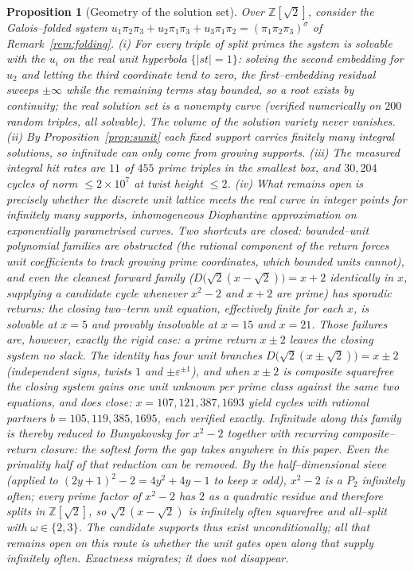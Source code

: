 \documentclass[11pt]{article}
\newtheorem{proposition}[theorem]{Proposition}
\theoremstyle{definition}
\begin{document}
\begin{proposition}[Geometry of the solution set]\label{prop:geometry}
Over $\mathbb{Z}[\sqrt2]$, consider the Galois--folded system
$u_1\pi_2\pi_3+u_2\pi_1\pi_3+u_3\pi_1\pi_2=(\pi_1\pi_2\pi_3)^\sigma$ of
Remark~\textup{\ref{rem:folding}}. \textup{(i)} For \emph{every} triple of split primes the system is
solvable with the $u_i$ on the real unit hyperbola $\{|st|=1\}$: solving the second embedding for $u_2$
and letting the third coordinate tend to zero, the first--embedding residual sweeps $\pm\infty$ while the
remaining terms stay bounded, so a root exists by continuity; the real solution set is a nonempty curve
\textup(verified numerically on $200$ random triples, all solvable\textup). The volume of the solution
variety never vanishes. \textup{(ii)} By Proposition~\textup{\ref{prop:sunit}} each fixed support carries
finitely many integral solutions, so infinitude can only come from growing supports. \textup{(iii)} The
measured integral hit rates are $11$ of $455$ prime triples in the smallest box, and $30{,}204$ cycles of
norm $\le2\times10^7$ at twist height $\le2$. \textup{(iv)} What remains open is precisely whether the
discrete unit lattice meets the real curve in integer points for infinitely many supports,
inhomogeneous Diophantine approximation on exponentially parametrised curves. Two shortcuts are closed:
bounded--unit polynomial families are obstructed (the rational component of the return forces unit
coefficients to track growing prime coordinates, which bounded units cannot), and even the cleanest
forward family ($D\bigl(\sqrt2(x-\sqrt2)\bigr)=x+2$ \emph{identically in} $x$, supplying a candidate
cycle whenever $x^2-2$ and $x+2$ are prime) has sporadic returns: the closing two--term unit equation,
effectively finite for each $x$, is solvable at $x=5$ and provably insolvable at $x=15$ and $x=21$.
Those failures are, however, exactly the rigid case: a \emph{prime} return $x\pm2$ leaves the closing
system no slack. The identity has four unit branches $D\bigl(\sqrt2(x\pm\sqrt2)\bigr)=x\pm2$ (independent
signs, twists $1$ and $\pm\varepsilon^{\pm1}$), and when $x\pm2$ is composite squarefree the closing
system gains one unit unknown per prime class against the same two equations, and does close:
$x=107,121,387,1693$ yield cycles with rational partners $b=105,119,385,1695$, each verified exactly.
Infinitude along this family is thereby reduced to Bunyakovsky for $x^2-2$ together with recurring
composite--return closure: the softest form the gap takes anywhere in this paper. Even the primality
half of that reduction can be removed. By the half--dimensional sieve
\cite{Iwaniec1978,LemkeOliver2012} (applied to $(2y+1)^2-2=4y^2+4y-1$ to keep $x$ odd), $x^2-2$ is a
$P_2$ infinitely often; every prime factor of $x^2-2$ has $2$ as a quadratic residue and therefore
splits in $\mathbb{Z}[\sqrt2]$, so $\sqrt2(x-\sqrt2)$ is infinitely often squarefree and all--split
with $\omega\in\{2,3\}$. The candidate supports thus exist \emph{unconditionally}; all that remains
open on this route is whether the unit gates open along that supply infinitely often.
Exactness migrates; it does not disappear.
\end{proposition}
\end{document}
